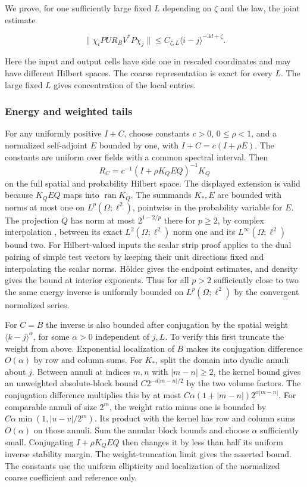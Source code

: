 \documentclass[11pt]{article}
\begin{document}
We prove, for one sufficiently large fixed \(L\) depending on \(\zeta\) and the law, the joint estimate

\begin{equation}\label{eq:joint-decay}
\big\|\chi_i P U R_B V^* P\chi_j\big\|
\le C_{\zeta,L}\langle i-j\rangle^{-3d+\zeta}.
\end{equation}

Here the input and output cells have side one in rescaled coordinates and may have different Hilbert spaces. The coarse representation is exact for every \(L\). The large fixed \(L\) gives concentration of the local entries.

\subsubsection{Energy and weighted tails}\label{energy-and-weighted-tails}

For any uniformly positive \(I+C\), choose constants \(c>0\), \(0\le\rho<1\), and a normalized self-adjoint \(E\) bounded by one, with \(I+C=c(I+\rho E)\). The constants are uniform over fields with a common spectral interval. Then \[
R_C=c^{-1}(I+\rho K_Q E Q)^{-1}K_Q
\] on the full spatial and probability Hilbert space. The displayed extension is valid because \(K_Q E Q\) maps into \(\operatorname{ran}K_Q\). The summands \(K_*,E\) are bounded with norms at most one on \(L^p(\Omega;\ell^2)\), pointwise in the probability variable for \(E\). The projection \(Q\) has norm at most \(2^{1-2/p}\) there for \(p\ge2\), by complex interpolation \cite[Theorem 21]{TaoInterpolation}, between its exact \(L^2(\Omega;\ell^2)\) norm one and its \(L^\infty(\Omega;\ell^2)\) bound two. For Hilbert-valued inputs the scalar strip proof applies to the dual pairing of simple test vectors by keeping their unit directions fixed and interpolating the scalar norms. Hölder gives the endpoint estimates, and density gives the bound at interior exponents. Thus for all \(p>2\) sufficiently close to two the same energy inverse is uniformly bounded on \(L^p(\Omega;\ell^2)\) by the convergent normalized series.

For \(C=B\) the inverse is also bounded after conjugation by the spatial weight \(\langle k-j\rangle^\alpha\), for some \(\alpha>0\) independent of \(j,L\). To verify this first truncate the weight from above. Exponential localization of \(B\) makes its conjugation difference \(O(\alpha)\) by row and column sums. For \(K_*\), split the domain into dyadic annuli about \(j\). Between annuli at indices \(m,n\) with \(|m-n|\ge2\), the kernel bound gives an unweighted absolute-block bound \(C2^{-d|m-n|/2}\) by the two volume factors. The conjugation difference multiplies this by at most \(C\alpha(1+|m-n|)2^{\alpha|m-n|}\). For comparable annuli of size \(2^m\), the weight ratio minus one is bounded by \(C\alpha\min(1,|u-v|/2^m)\). Its product with the kernel has row and column sums \(O(\alpha)\) on those annuli. Sum the annular block bounds and choose \(\alpha\) sufficiently small. Conjugating \(I+\rho K_Q E Q\) then changes it by less than half its uniform inverse stability margin. The weight-truncation limit gives the asserted bound. The constants use the uniform ellipticity and localization of the normalized coarse coefficient and reference only.
\end{document}
